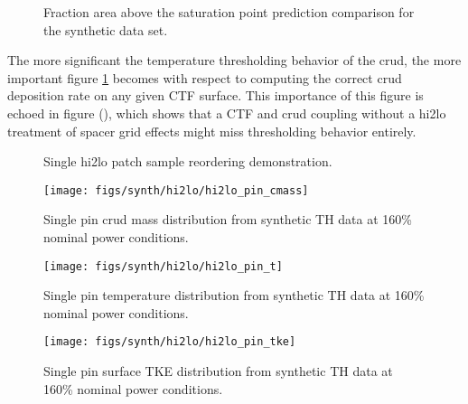 \begin{figure}[H]%
    \centering
    \qquad
    \caption[]{Fraction area above the saturation point prediction comparison for the synthetic data set.}%
    \label{fig:frac_a}%
\end{figure}

The more significant the temperature thresholding behavior of the crud, the more important figure \ref{fig:frac_a} becomes with respect to computing the correct crud deposition rate on any given CTF surface.  This importance of this figure is echoed in figure (), which shows that a CTF and crud coupling without a hi2lo treatment of spacer grid effects might miss thresholding behavior entirely.

\begin{figure}[H]%
    \centering
    \qquad
    \caption[]{Single hi2lo patch sample reordering demonstration.}%
    \label{fig:reshuffle_a}%
\end{figure}


\begin{figure}[H]
    \centering
    \texttt{[image: figs/synth/hi2lo/hi2lo\_pin\_cmass]}
    \caption{Single pin crud mass distribution from synthetic TH data at 160\% nominal power conditions.}
    \label{fig:hi2lopincmass}
\end{figure}
\begin{figure}[H]
    \centering
    \texttt{[image: figs/synth/hi2lo/hi2lo\_pin\_t]}
    \caption{Single pin temperature distribution from synthetic TH data at 160\% nominal power conditions.}
    \label{fig:hi2lopint}
\end{figure}
\begin{figure}[H]
    \centering
    \texttt{[image: figs/synth/hi2lo/hi2lo\_pin\_tke]}
    \caption{Single pin surface TKE distribution from synthetic TH data at 160\% nominal power conditions.}
    \label{fig:hi2lopintke}
\end{figure}

